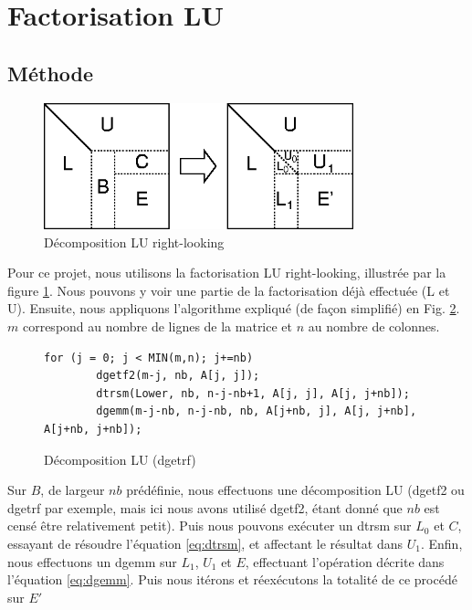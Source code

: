 \section{Factorisation LU} %
\label{sec:factorisation_lu}

\subsection{Méthode} %
\label{sub:methode}

\begin{figure}[H]
\centering
\includegraphics[width=0.8\textwidth]{lu}
\caption{Décomposition LU right-looking}
\label{fig:lu}
\end{figure}

Pour ce projet, nous utilisons la factorisation LU right-looking, illustrée par la figure \ref{fig:lu}. Nous pouvons y voir une partie de la factorisation déjà effectuée (L et U). Ensuite, nous appliquons l'algorithme expliqué (de façon simplifié) en Fig. \ref{code:lu}. $m$ correspond au nombre de lignes de la matrice et $n$ au nombre de colonnes. 

\begin{figure}[H]
\begin{lstlisting}
for (j = 0; j < MIN(m,n); j+=nb)
		dgetf2(m-j, nb, A[j, j]);
		dtrsm(Lower, nb, n-j-nb+1, A[j, j], A[j, j+nb]);
		dgemm(m-j-nb, n-j-nb, nb, A[j+nb, j], A[j, j+nb], A[j+nb, j+nb]);
\end{lstlisting}
\caption{Décomposition LU (dgetrf)}
\label{code:lu}
\end{figure}
Sur $B$, de largeur $nb$ prédéfinie, nous effectuons une décomposition LU (dgetf2 ou dgetrf par exemple, mais ici nous avons utilisé dgetf2, étant donné que $nb$ est censé être relativement petit). Puis nous pouvons exécuter un dtrsm sur $L_0$ et $C$, essayant de résoudre l'équation \ref{eq:dtrsm}, et affectant le résultat dans $U_1$. Enfin, nous effectuons un dgemm sur $L_1$, $U_1$ et $E$, effectuant l'opération décrite dans l'équation \ref{eq:dgemm}. Puis nous itérons et réexécutons la totalité de ce procédé sur $E'$

